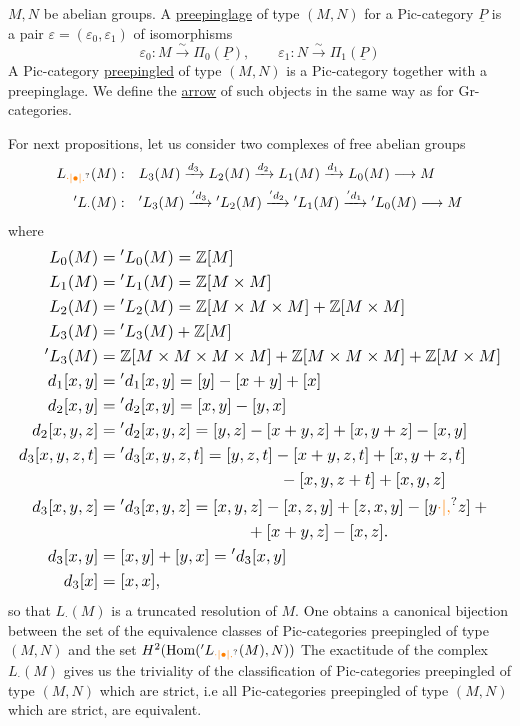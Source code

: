  $M,N$ be abelian groups. A \uline{preepinglage} of type $(M,N)$ for a Pic-category $\underline P$ is a pair $\varepsilon=(\varepsilon_0,\varepsilon_1)$ of isomorphisms
\[
\varepsilon_0:M\xrightarrow{\sim}\Pi_0(\underline P),\qquad
\varepsilon_1:N\xrightarrow{\sim}\Pi_1(\underline P)
\]
A Pic-category \uline{preepingled} of type $(M,N)$ is a Pic-category together with a preepinglage. We define the \uline{arrow} of such objects in the same way as for Gr-categories.

For next propositions, let us consider two complexes of free abelian groups
\[
\begin{aligned}
L_{\unsure{\cdot|\bullet|.}}(M):\quad &L_3(M)\xrightarrow{d_3}L_2(M)\xrightarrow{d_2}L_1(M)\xrightarrow{d_1}L_0(M)\longrightarrow M\\
{}'L_{\cdot}(M):\quad &{}'L_3(M)\xrightarrow{{}'d_3}{}'L_2(M)\xrightarrow{{}'d_2}{}'L_1(M)\xrightarrow{{}'d_1}{}'L_0(M)\longrightarrow M
\end{aligned}
\]
where
\[
\resizebox{\linewidth}{!}{$\displaystyle
\begin{aligned}
L_0(M)&={}'L_0(M)=\mathbb Z[M]\\
L_1(M)&={}'L_1(M)=\mathbb Z[M\times M]\\
L_2(M)&={}'L_2(M)=\mathbb Z[M\times M\times M]+\mathbb Z[M\times M]\\
L_3(M)&={}'L_3(M)+\mathbb Z[M]\\
{}'L_3(M)&=\mathbb Z[M\times M\times M\times M]+\mathbb Z[M\times M\times M]+\mathbb Z[M\times M]\\
d_1[x,y]&={}'d_1[x,y]=[y]-[x+y]+[x]\\
d_2[x,y]&={}'d_2[x,y]=[x,y]-[y,x]\\
d_2[x,y,z]&={}'d_2[x,y,z]=[y,z]-[x+y,z]+[x,y+z]-[x,y]\\
d_3[x,y,z,t]&={}'d_3[x,y,z,t]=[y,z,t]-[x+y,z,t]+[x,y+z,t]\\
&\hspace{11em}{}-[x,y,z+t]+[x,y,z]\\
d_3[x,y,z]&={}'d_3[x,y,z]=[x,y,z]-[x,z,y]+[z,x,y]-[y\unsure{\mathord{\cdot}|{,}}z]+{}\\
&\hspace{9em}{}+[x+y,z]-[x,z].\\
d_3[x,y]&=[x,y]+[y,x]={}'d_3[x,y]\\
d_3[x]&=[x,x],
\end{aligned}$}
\]
so that $L_{\cdot}(M)$ is a truncated resolution of $M$. One obtains a canonical bijection between the set of the equivalence classes of
Pic-categories preepingled of type $(M,N)$ and the set $H^2(\operatorname{Hom}({}'L_{\unsure{\cdot|\bullet|.}}(M),N))$
The exactitude of the complex $L_{\cdot}(M)$ gives us the triviality of the classification of Pic-categories preepingled of type $(M,N)$ which are strict, i.e all Pic-categories preepingled of type $(M,N)$ which are strict, are equivalent.

